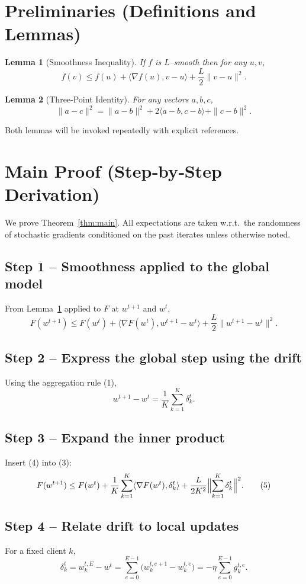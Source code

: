 \documentclass[11pt]{article}
\newtheorem{lemma}{Lemma}
\begin{document}
\newpage
\section*{Preliminaries (Definitions and Lemmas)}
\begin{lemma}[Smoothness Inequality]\label{lem:smooth}
If $f$ is $L$–smooth then for any $u,v$,
\[
f(v)\le f(u)+\langle\nabla f(u),v-u\rangle+\frac{L}{2}\|v-u\|^{2}.
\]
\end{lemma}
\begin{lemma}[Three‑Point Identity]\label{lem:three}
For any vectors $a,b,c$,
\[
\|a-c\|^{2}= \|a-b\|^{2}+2\langle a-b,c-b\rangle+\|c-b\|^{2}.
\]
\end{lemma}
Both lemmas will be invoked repeatedly with explicit references.

\section*{Main Proof (Step‑by‑Step Derivation)}
We prove Theorem~\ref{thm:main}.  
All expectations are taken w.r.t.\ the randomness of stochastic gradients
conditioned on the past iterates unless otherwise noted.

\subsection*{Step 1 – Smoothness applied to the global model}
From Lemma~\ref{lem:smooth} applied to $F$ at $w^{t+1}$ and $w^{t}$,
\[
F(w^{t+1})\le F(w^{t})+\langle\nabla F(w^{t}),w^{t+1}-w^{t}\rangle
+\frac{L}{2}\|w^{t+1}-w^{t}\|^{2}.
\tag{3}
\]

\subsection*{Step 2 – Express the global step using the drift}
Using the aggregation rule (1),
\[
w^{t+1}-w^{t}= \frac1K\sum_{k=1}^{K}\delta_{k}^{t}.
\tag{4}
\]

\subsection*{Step 3 – Expand the inner product}
Insert (4) into (3):
\[
F(w^{t+1})\le F(w^{t})+
\frac1K\sum_{k=1}^{K}\langle\nabla F(w^{t}),\delta_{k}^{t}\rangle
+\frac{L}{2K^{2}}\Bigl\|\sum_{k=1}^{K}\delta_{k}^{t}\Bigr\|^{2}.
\tag{5}
\]

\subsection*{Step 4 – Relate drift to local updates}
For a fixed client $k$,
\[
\delta_{k}^{t}=w_{k}^{t,E}-w^{t}
=\sum_{e=0}^{E-1}\bigl(w_{k}^{t,e+1}-w_{k}^{t,e}\bigr)
=-\eta\sum_{e=0}^{E-1}g_{k}^{t,e}.
\tag{6}
\]
\end{document}
